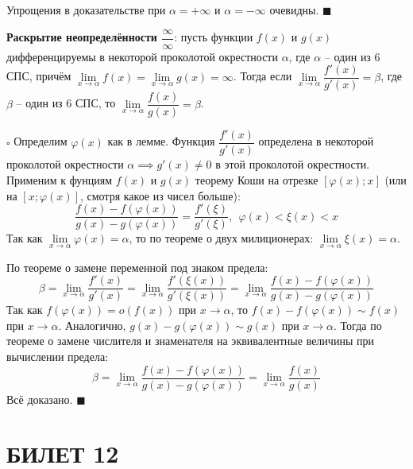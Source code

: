 \documentclass[12pt, a4paper, reqno]{article}
\begin{document}
    Упрощения в доказательстве при $\alpha = +\infty$ и $\alpha = -\infty$ очевидны. $\blacksquare$

    \textbf{Раскрытие неопределённости $\dfrac{\infty}{\infty}$}: пусть функции $f(x)$ и $g(x)$
    дифференцируемы в некоторой проколотой окрестности $\alpha$, где $\alpha$ -- один из 6 СПС,
    причём $\lim\limits_{x\to\alpha} f(x) = \lim\limits_{x\to\alpha} g(x) = \infty$. Тогда если
    $\lim\limits_{x\to\alpha} \dfrac{f'(x)}{g'(x)} = \beta$, где $\beta$ -- один из 6 СПС, то
    $\lim\limits_{x\to\alpha} \dfrac{f(x)}{g(x)} = \beta$.

    $\square$ Определим $\varphi(x)$ как в лемме.
    Функция $\dfrac{f'(x)}{g'(x)}$ определена в некоторой проколотой окрестности $\alpha
    \implies g'(x)\neq 0$ в этой проколотой окрестности. Применим к фунциям $f(x)$ и $g(x)$ теорему
    Коши на отрезке $[\varphi(x); x]$ (или на $[x; \varphi(x)]$, смотря какое из чисел больше):
    \begin{equation*}
        \dfrac{f(x) - f(\varphi(x))}{g(x) - g(\varphi(x))} =
        \dfrac{f'(\xi)}{g'(\xi)},\>\>\varphi(x) < \xi(x) < x
    \end{equation*}
    Так как $\lim\limits_{x\to\alpha}\varphi(x) = \alpha$, то по теореме о двух милиционерах:
    $\lim\limits_{x\to\alpha}\xi(x) = \alpha$.

    По теореме о замене переменной под знаком предела:
    \begin{equation*}
        \beta =
        \lim\limits_{x\to\alpha}\dfrac{f'(x)}{g'(x)} =
        \lim\limits_{x\to\alpha}\dfrac{f'(\xi(x))}{g'(\xi(x))} =
        \lim\limits_{x\to\alpha} \dfrac{f(x) - f(\varphi(x))}{g(x) - g(\varphi(x))}
    \end{equation*}
    Так как $f(\varphi(x)) = o(f(x))$ при $x\to\alpha$, то $f(x) - f(\varphi(x)) \sim f(x)$ при
    $x\to\alpha$. Аналогично, $g(x) - g(\varphi(x)) \sim g(x)$ при $x\to\alpha$. Тогда по теореме о
    замене числителя и знаменателя на эквивалентные величины при вычислении предела:
    \begin{equation*}
        \beta =
        \lim\limits_{x\to\alpha} \dfrac{f(x) - f(\varphi(x))}{g(x) - g(\varphi(x))} =
        \lim\limits_{x\to\alpha} \dfrac{f(x)}{g(x)}
    \end{equation*}
    Всё доказано. $\blacksquare$

\newpage
\section{БИЛЕТ 12}
\end{document}
